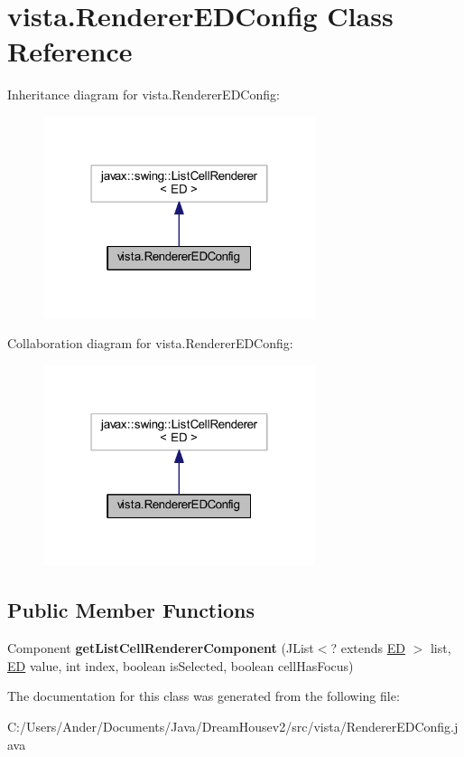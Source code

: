 \hypertarget{classvista_1_1_renderer_e_d_config}{}\section{vista.\+Renderer\+E\+D\+Config Class Reference}
\label{classvista_1_1_renderer_e_d_config}


Inheritance diagram for vista.\+Renderer\+E\+D\+Config\+:
\nopagebreak
\begin{figure}[H]
\begin{center}
\leavevmode
\includegraphics[width=226pt]{classvista_1_1_renderer_e_d_config__inherit__graph}
\end{center}
\end{figure}


Collaboration diagram for vista.\+Renderer\+E\+D\+Config\+:
\nopagebreak
\begin{figure}[H]
\begin{center}
\leavevmode
\includegraphics[width=226pt]{classvista_1_1_renderer_e_d_config__coll__graph}
\end{center}
\end{figure}
\subsection*{Public Member Functions}
\begin{DoxyCompactItemize}
\item 
\mbox{\label{classvista_1_1_renderer_e_d_config_ab2e3d5e37cd5be21f3e147b362970483}} 
Component {\bfseries get\+List\+Cell\+Renderer\+Component} (J\+List$<$? extends \mbox{\hyperlink{classmodelo_1_1_e_d}{ED}} $>$ list, \mbox{\hyperlink{classmodelo_1_1_e_d}{ED}} value, int index, boolean is\+Selected, boolean cell\+Has\+Focus)
\end{DoxyCompactItemize}


The documentation for this class was generated from the following file\+:\begin{DoxyCompactItemize}
\item 
C\+:/\+Users/\+Ander/\+Documents/\+Java/\+Dream\+Housev2/src/vista/Renderer\+E\+D\+Config.\+java\end{DoxyCompactItemize}
